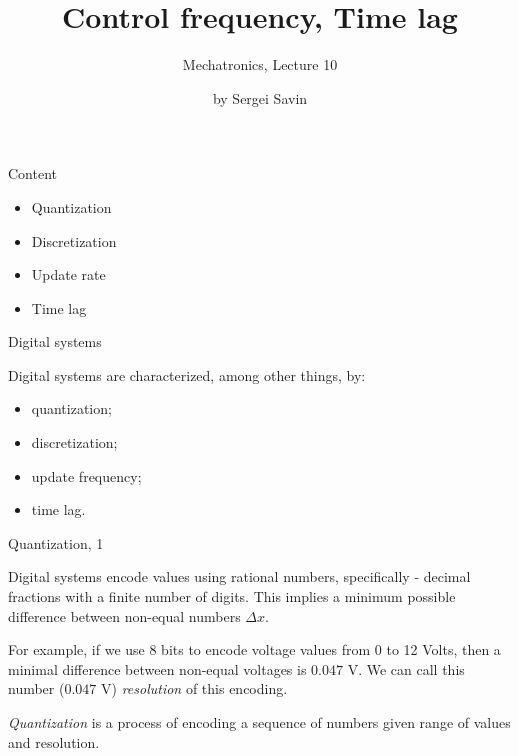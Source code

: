 \documentclass{beamer}
\title{Control frequency, Time lag}
\subtitle{Mechatronics, Lecture 10}
\author{by Sergei Savin}
\date{\mydate}
\begin{document}
\maketitle



\begin{frame}{Content}
\begin{itemize}
	\item Quantization
	\item Discretization
	\item Update rate
	\item Time lag
\end{itemize}
\end{frame}




\begin{frame}{Digital systems}
	\begin{flushleft}
		
		Digital systems are characterized, among other things, by:
		
		\begin{itemize}
			\item quantization;
			\item discretization;
			\item update frequency;
			\item time lag.
		\end{itemize}
		
		
	\end{flushleft}
\end{frame}



\begin{frame}{Quantization, 1}
	\begin{flushleft}
		
		Digital systems encode values using rational numbers, specifically - decimal fractions with a finite number of digits. This implies a minimum possible difference between non-equal numbers $\Delta x$.
		
		\bigskip
		
		For example, if we use 8 bits to encode voltage values from 0 to 12 Volts, then a minimal difference between non-equal voltages is $0.047$ V. We can call this number ($0.047$ V) \emph{resolution} of this encoding.
		
		\bigskip
		
		\emph{Quantization} is a process of encoding a sequence of numbers given range of values and resolution.
		
	\end{flushleft}
\end{frame}
\end{document}
